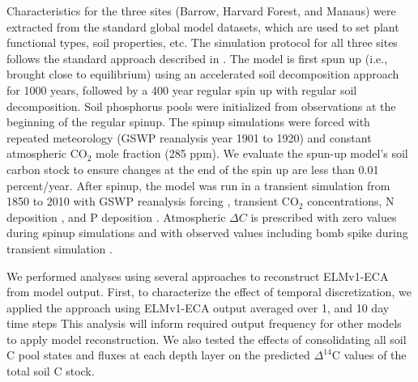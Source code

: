 \documentclass[11pt,a4paper]{article}
\newcommand{\red}[1]{\textcolor{red}{#1}}
\newcommand{\gray}[1]{\textcolor{gray}{#1}}
\begin{document}
    
    Characteristics for the three sites (Barrow, Harvard Forest, and Manaus) were extracted from the standard global model datasets, which are used to set plant functional types, soil properties, etc. The simulation protocol for all three sites follows the standard approach described in \citet{Oleson2010}. The model is first spun up (i.e., brought close to equilibrium) using an accelerated soil decomposition approach \citep{Koven2013} for 1000 years, followed by a 400 year regular spin up with regular soil decomposition. Soil phosphorus pools were initialized from observations \citep{Yang2013} at the beginning of the regular spinup. The spinup simulations were forced with repeated meteorology (GSWP reanalysis \citep{Dirmeyer2006} year 1901 to 1920) and constant atmospheric CO$_2$ mole fraction (285 ppm). We evaluate the spun-up model's soil carbon stock to ensure changes at the end of the spin up are less than 0.01 percent/year. After spinup, the model was run in a transient simulation from 1850 to 2010 with GSWP reanalysis forcing \citep{Dirmeyer2006}, transient CO$_2$ concentrations, N deposition \citep{Lamarque2005}, and P deposition \citep{Mahowald2008}. Atmospheric \begin{math}  \Delta{C} \end{math} is prescribed with zero values during spinup simulations and with observed values including bomb spike during transient simulation \citep{Levin2010}.
    
    
    
    We performed analyses using several approaches to reconstruct ELMv1-ECA from model output. First, to characterize the effect of temporal discretization, we applied the approach using ELMv1-ECA output averaged over 1, and 10 day time steps 
    This analysis will inform required output frequency for other models to apply model reconstruction. We also tested the effects of consolidating all soil C pool states and fluxes at each depth layer on the predicted $\Delta^{14}$C values of the total soil C stock. 
\end{document}
